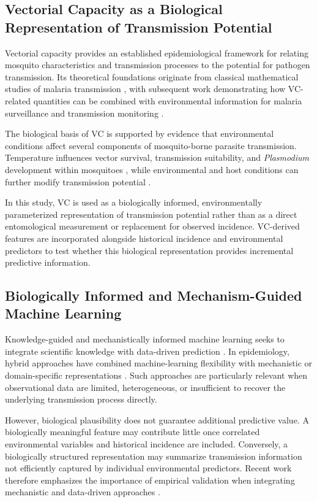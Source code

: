 \documentclass[10pt,twocolumn]{article}
\begin{document}
\subsection{Vectorial Capacity as a Biological Representation of
Transmission Potential}

Vectorial capacity provides an established epidemiological framework
for relating mosquito characteristics and transmission processes to
the potential for pathogen transmission. Its theoretical foundations
originate from classical mathematical studies of malaria transmission
\parencite{Ross1905,Ross1911a}, with subsequent work demonstrating how
VC-related quantities can be combined with environmental information
for malaria surveillance and transmission monitoring
\parencite{Ceccato2012}.

The biological basis of VC is supported by evidence that environmental
conditions affect several components of mosquito-borne parasite
transmission. Temperature influences vector survival, transmission
suitability, and \textit{Plasmodium} development within mosquitoes
\parencite{Villena2022,Suh2024}, while environmental and host
conditions can further modify transmission potential
\parencite{Dahlin2024}.

In this study, VC is used as a biologically informed, environmentally
parameterized representation of transmission potential rather than as
a direct entomological measurement or replacement for observed
incidence. VC-derived features are incorporated alongside historical
incidence and environmental predictors to test whether this biological
representation provides incremental predictive information.


\subsection{Biologically Informed and Mechanism-Guided Machine
Learning}

Knowledge-guided and mechanistically informed machine learning seeks
to integrate scientific knowledge with data-driven prediction
\parencite{Wang2020,Yin2019,Karpatne2024}. In epidemiology, hybrid
approaches have combined machine-learning flexibility with
mechanistic or domain-specific representations
\parencite{Jhutty2022,Han2024,Millevoi2024}. Such approaches are
particularly relevant when observational data are limited,
heterogeneous, or insufficient to recover the underlying transmission
process directly.

However, biological plausibility does not guarantee additional
predictive value. A biologically meaningful feature may contribute
little once correlated environmental variables and historical
incidence are included. Conversely, a biologically structured
representation may summarize transmission information not efficiently
captured by individual environmental predictors. Recent work therefore
emphasizes the importance of empirical validation when integrating
mechanistic and data-driven approaches \parencite{Ye2025}.
\end{document}
